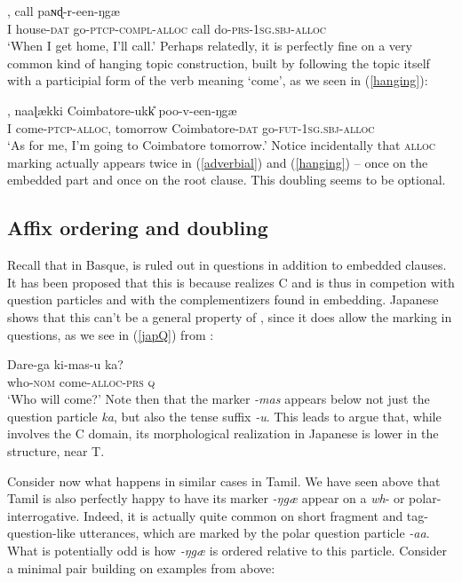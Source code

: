\documentclass[output=paper, modfonts, nonflat]{langsci/langscibook}
\begin{document}
\ea\label{adverbial}, call paɴɖ-r-een-ŋgæ\\ 
I house-\textsc{dat}{} go-\textsc{ptcp}-\textsc{compl}-\textsc{alloc}{} call
do-\textsc{prs}-\textsc{1sg}.\textsc{sbj}-\textsc{alloc}\\ 
\glt `When I get home, I'll call.'
\z
%
Perhaps relatedly, it is perfectly fine on a very common kind of
hanging topic construction, built by following the topic itself with a
participial form of the verb meaning `come', as we seen in
(\ref{hanging}):

\ea\label{hanging}, naaɭækki Coimbatore-ukk\U{} poo-v-een-ŋgæ\\
I come-\textsc{ptcp}-\textsc{alloc}, tomorrow Coimbatore-\textsc{dat}{}
go-\textsc{fut}-\textsc{1sg}.\textsc{sbj}-\textsc{alloc}\\ 
\glt `As for me, I'm going to Coimbatore tomorrow.'
\z
%
Notice incidentally that \textsc{alloc}{} marking actually appears twice in
(\ref{adverbial}) and (\ref{hanging}) -- once on the embedded part
and once on the root clause. This doubling seems to be optional. 


\subsection{Affix ordering and doubling}
\label{sec:orderdoub}


Recall that in Basque, \allagr{} is ruled out in questions in addition
to embedded clauses. It has been proposed that this is because
\allagr{} realizes C and is thus in competion with question particles
and with the complementizers found in embedding.  Japanese shows that
this can't be a general property of \allagr, since it does allow the
marking in questions, as we see in (\ref{japQ}) from
\citet{miyagawa:2017}:

\ea\label{japQ}\gll Dare-ga ki-mas-u ka?\\
who-\textsc{nom}{} come-\textsc{alloc}-\textsc{prs}{} \textsc{q}\\
\glt `Who will come?'
\z
%
Note then that the \allagr{} marker \textit{-mas} appears below not
just the question particle \textit{ka}, but also the tense suffix
\textit{-u}. This leads \citet{miyagawa:2017} to argue that, while
\allagr{} involves the C domain, its morphological realization in
Japanese is lower in the structure, near T.

Consider now what happens in similar cases in Tamil.  We have seen
above that Tamil is also perfectly happy to have its \allagr{} marker
\textit{-ŋgæ} appear on a \textit{wh}- or polar-interrogative.
Indeed, it is actually quite common on short fragment and
tag-question-like utterances, which are marked by the polar question
particle \textit{-aa}.  What is potentially odd is how \textit{-ŋgæ}
is ordered relative to this particle.  Consider a minimal pair
building on examples from above:
\end{document}
